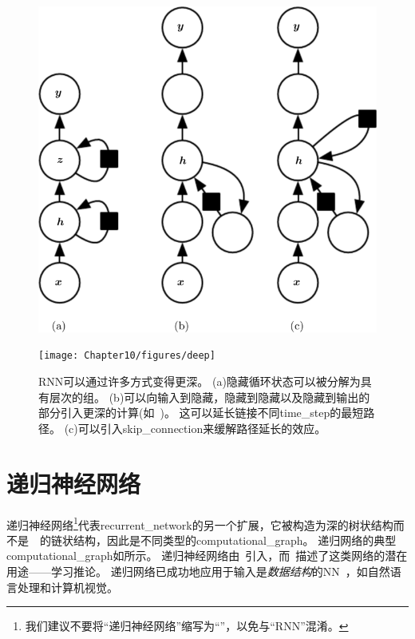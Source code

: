 
\begin{figure}[!htb]
\ifOpenSource
\centerline{\includegraphics[scale=0.5]{images/101.png}}
\else
\centerline{\texttt{[image: Chapter10/figures/deep]}}
\fi
\caption{\gls{RNN}可以通过许多方式变得更深\citep{Pascanu-et-al-2014a}。
(a)隐藏循环状态可以被分解为具有层次的组。
(b)可以向输入到隐藏，隐藏到隐藏以及隐藏到输出的部分引入更深的计算(如~)。
这可以延长链接不同\gls{time_step}的最短路径。
(c)可以引入\gls{skip_connection}来缓解路径延长的效应。
}
\label{fig:chap10_deep}
\end{figure}

\section{递归神经网络}
\label{sec:recursive_neural_networks}
递归神经网络\footnote{我们建议不要将``递归神经网络''缩写为``''，以免与``\gls{RNN}''混淆。}代表\gls{recurrent_network}的另一个扩展，它被构造为深的树状结构而不是~~的链状结构，因此是不同类型的\gls{computational_graph}。
递归网络的典型\gls{computational_graph}如所示。
递归神经网络由~\cite{Pollack-1990}引入，而~\cite{Bottou-2011}描述了这类网络的潜在用途——学习推论。
递归网络已成功地应用于输入是\emph{数据结构}的\gls{NN}~\citep{Frasconi-et-al-1997,Frasconi-et-al-1998}，如自然语言处理\citep{Socher-et-al-2011a,Socher-et-al-2011c,Socher-et-al-2013a}和计算机视觉\citep{Socher-et-al-2011b}。

